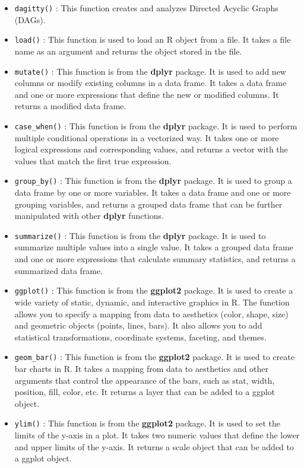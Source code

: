 \documentclass[
]{book}
\providecommand{\tightlist}{%
  \setlength{\itemsep}{0pt}\setlength{\parskip}{0pt}}
\begin{document}
\begin{itemize}
\tightlist
\item
  \texttt{dagitty()} : This function creates and analyzes Directed Acyclic Graphs (DAGs).
\item
  \texttt{load()} : This function is used to load an R object from a file. It takes a file name as an argument and returns the object stored in the file.
\item
  \texttt{mutate()} : This function is from the \textbf{dplyr} package. It is used to add new columns or modify existing columns in a data frame. It takes a data frame and one or more expressions that define the new or modified columns. It returns a modified data frame.
\item
  \texttt{case\_when()} : This function is from the \textbf{dplyr} package. It is used to perform multiple conditional operations in a vectorized way. It takes one or more logical expressions and corresponding values, and returns a vector with the values that match the first true expression.
\item
  \texttt{group\_by()} : This function is from the \textbf{dplyr} package. It is used to group a data frame by one or more variables. It takes a data frame and one or more grouping variables, and returns a grouped data frame that can be further manipulated with other \textbf{dplyr} functions.
\item
  \texttt{summarize()} : This function is from the \textbf{dplyr} package. It is used to summarize multiple values into a single value. It takes a grouped data frame and one or more expressions that calculate summary statistics, and returns a summarized data frame.
\item
  \texttt{ggplot()} : This function is from the \textbf{ggplot2} package. It is used to create a wide variety of static, dynamic, and interactive graphics in R. The function allows you to specify a mapping from data to aesthetics (color, shape, size) and geometric objects (points, lines, bars). It also allows you to add statistical transformations, coordinate systems, faceting, and themes.
\item
  \texttt{geom\_bar()} : This function is from the \textbf{ggplot2} package. It is used to create bar charts in R. It takes a mapping from data to aesthetics and other arguments that control the appearance of the bars, such as stat, width, position, fill, color, etc. It returns a layer that can be added to a ggplot object.
\item
  \texttt{ylim()} : This function is from the \textbf{ggplot2} package. It is used to set the limits of the y-axis in a plot. It takes two numeric values that define the lower and upper limits of the y-axis. It returns a scale object that can be added to a ggplot object.

\end{itemize}
\end{document}
